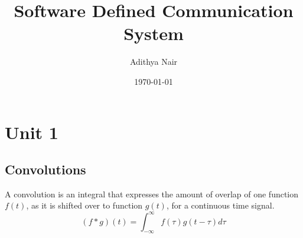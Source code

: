 \documentclass[11pt]{report}
\author{Adithya Nair}
\date{\today}
\title{Software Defined Communication System}
\begin{document}
\maketitle
\tableofcontents

\part{Unit 1}
\label{sec:org73c0413}
\chapter{Convolutions}
\label{sec:orge8ad0c4}
\begin{definition}[Convolution]
A convolution is an integral that expresses the amount of overlap of one function $f(t)$, as it is shifted over to function $g(t)$, for a continuous time signal.
\[
(f * g)(t) = \int_{-\infty}^{\infty} f(\tau)g(t - \tau) d \tau
\]
\end{definition}
\end{document}

